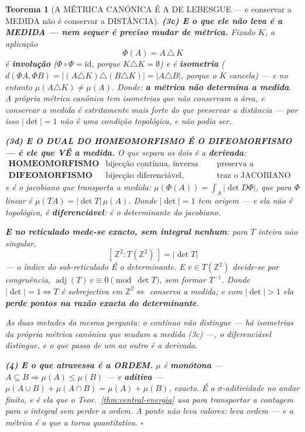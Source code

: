 \documentclass[11pt,a4paper]{article}
\newtheorem{teorema}{Teorema}
\newcommand{\abs}[1]{\lvert #1\rvert}
\begin{document}
\begin{teorema}[A MÉTRICA CANÓNICA É A DE LEBESGUE --- e conservar a MEDIDA não é
conservar a DISTÂNCIA]
\textbf{(3c) E o que ele não leva é a MEDIDA --- nem sequer é preciso mudar de métrica.}
Fixado $K$, a aplicação
\[
\boxed{\;\Phi(A)=A\,\triangle\,K\;}
\]
é \textbf{involução} ($\Phi\circ\Phi=\mathrm{id}$, porque $K\triangle K=\emptyset$) e é
\textbf{isometria} ($d(\Phi A,\Phi B)=\abs{(A\triangle K)\triangle(B\triangle K)}
=\abs{A\triangle B}$, porque o $K$ cancela) --- \emph{e no entanto}
$\mu(A\triangle K)\neq\mu(A)$. Donde: \textbf{a métrica não determina a medida}. A própria
métrica canónica tem isometrias que não conservam a área, e \emph{conservar a medida é
estritamente mais forte do que preservar a distância} --- por isso $\abs{\det}=1$ não é uma
condição topológica, e não podia ser.

\textbf{(3d) E O DUAL DO HOMEOMORFISMO É O DIFEOMORFISMO --- é ele que VÊ a medida.} O
que separa os dois é a \textbf{derivada}:
\[
\begin{array}{lll}
\textbf{HOMEOMORFISMO} & \text{bijecção contínua, inversa contínua} &
\text{preserva a TOPOLOGIA}\\[2pt]
\textbf{DIFEOMORFISMO} & \text{bijecção diferenciável, inversa idem} &
\text{traz o JACOBIANO}
\end{array}
\]
e é o jacobiano que transporta a medida: $\mu(\Phi(A))=\int_A\abs{\det D\Phi}$, que para
$\Phi$ linear é $\mu(TA)=\abs{\det T}\,\mu(A)$. \emph{Donde $\abs{\det}=1$ tem origem} ---
e ela não é topológica, é \textbf{diferenciável}: é o determinante do jacobiano.

\textbf{E no reticulado mede-se exacto, sem integral nenhum}: para $T$ inteira não
singular,
\[
\boxed{\;[\,\mathbb{Z}^{2}:T(\mathbb{Z}^{2})\,]=\abs{\det T}\;}
\]
--- o \emph{índice} do sub-reticulado É o determinante. E $v\in T(\mathbb{Z}^{2})$
decide-se por congruência, $\operatorname{adj}(T)\,v\equiv0\pmod{\det T}$, sem formar
$T^{-1}$. Donde $\abs{\det}=1\iff T$ é sobrejectiva em $\mathbb{Z}^{2}\iff$ conserva a
medida; e com $\abs{\det}>1$ ela \textbf{perde pontos na razão exacta do determinante}.

\emph{As duas metades da mesma pergunta}: o contínuo não distingue --- há isometrias da
própria métrica canónica que mudam a medida (3c) ---, o diferenciável distingue, e o que
passa de um ao outro é a derivada.

\textbf{(4) E o que atravessa é a ORDEM.} $\mu$ é \textbf{monótona} --- $A\subseteq B
\Rightarrow\mu(A)\leq\mu(B)$ --- e \textbf{aditiva} ---
$\mu(A\cup B)+\mu(A\cap B)=\mu(A)+\mu(B)$, exacto. É a $\sigma$-aditividade no andar
finito, e é ela que o Teor.~\ref{thm:central-energia} usa para transportar a contagem para
o integral \emph{sem perder a ordem}. \emph{A ponte não leva valores: leva ordem} ---
e a métrica é o que a torna quantitativa. $\square$
\end{teorema}
\end{document}
